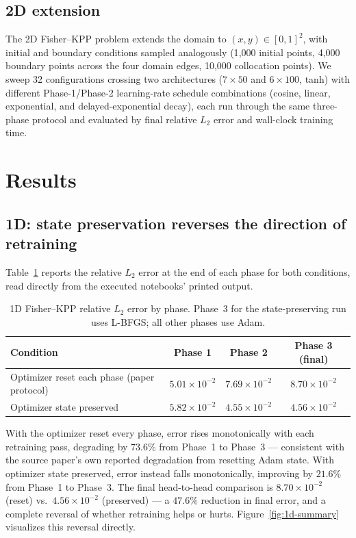 \documentclass[11pt]{article}
\begin{document}
\subsection{2D extension}

The 2D Fisher--KPP problem extends the domain to $(x,y) \in [0,1]^2$, with initial and boundary
conditions sampled analogously (1{,}000 initial points, 4{,}000 boundary points across the four domain
edges, 10{,}000 collocation points). We sweep 32 configurations crossing two architectures
($7\times50$ and $6\times100$, tanh) with different Phase-1/Phase-2 learning-rate schedule combinations
(cosine, linear, exponential, and delayed-exponential decay), each run through the same three-phase
protocol and evaluated by final relative $L_2$ error and wall-clock training time.

\section{Results}
\label{sec:results}

\subsection{1D: state preservation reverses the direction of retraining}

Table~\ref{tab:1d-results} reports the relative $L_2$ error at the end of each phase for both
conditions, read directly from the executed notebooks' printed output.

\begin{table}[h]
\centering
\caption{1D Fisher--KPP relative $L_2$ error by phase. Phase~3 for the state-preserving run uses
L-BFGS; all other phases use Adam.}
\label{tab:1d-results}
\begin{tabular}{lccc}
\toprule
Condition & Phase 1 & Phase 2 & Phase 3 (final) \\
\midrule
Optimizer reset each phase (paper protocol) & $5.01\times10^{-2}$ & $7.69\times10^{-2}$ & $8.70\times10^{-2}$ \\
Optimizer state preserved & $5.82\times10^{-2}$ & $4.55\times10^{-2}$ & $4.56\times10^{-2}$ \\
\bottomrule
\end{tabular}
\end{table}

With the optimizer reset every phase, error rises monotonically with each retraining pass, degrading by
$73.6\%$ from Phase~1 to Phase~3 --- consistent with the source paper's own reported degradation from
resetting Adam state. With optimizer state preserved, error instead falls monotonically, improving by
$21.6\%$ from Phase~1 to Phase~3. The final head-to-head comparison is
$8.70\times10^{-2}$ (reset) vs.\ $4.56\times10^{-2}$ (preserved) --- a $\mathbf{47.6\%}$ reduction in
final error, and a complete reversal of whether retraining helps or hurts. Figure~\ref{fig:1d-summary}
visualizes this reversal directly.
\end{document}
